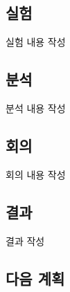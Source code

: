 \documentclass{research-note-v1.0}
\begin{document}
\subsection*{실험}

실험 내용 작성

\subsection*{분석}

분석 내용 작성

\subsection*{회의}

회의 내용 작성

\subsection*{결과}

결과 작성


\subsection*{다음 계획}
\end{document}
